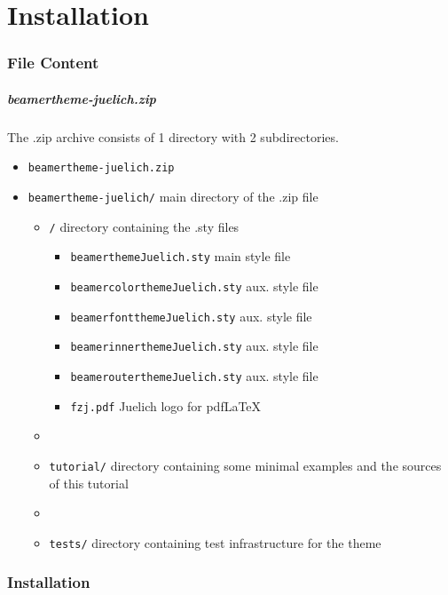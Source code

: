 %
\part{Installation}
\makepart

\section{File Content}
\begin{frame}[fragile]
        \frametitle{beamertheme-juelich.zip}
        The .zip archive consists of 1 directory with 2 subdirectories.
        \begin{itemize}
      \item \verb+beamertheme-juelich.zip+
      \item \verb+beamertheme-juelich/+ \hfill main directory of the .zip file
      \begin{itemize}
        \item \verb+/+ \hfill directory containing the .sty files
        \begin{itemize}
          \item \verb+beamerthemeJuelich.sty+ \hfill main style file
          \item \verb+beamercolorthemeJuelich.sty+ \hfill aux. style file
          \item \verb+beamerfontthemeJuelich.sty+ \hfill aux. style file
          \item \verb+beamerinnerthemeJuelich.sty+ \hfill aux. style file
          \item \verb+beamerouterthemeJuelich.sty+ \hfill aux. style file
          \item \verb+fzj.pdf+ \hfill Juelich logo for pdf\LaTeX
        \end{itemize}
        \item[]
        \item \verb+tutorial/+ \hfill directory containing some minimal examples and the sources of this tutorial
        \item[]
        \item \verb+tests/+ \hfill directory containing test infrastructure for the theme
      \end{itemize}
    \end{itemize}
\end{frame}

\section{Installation}

